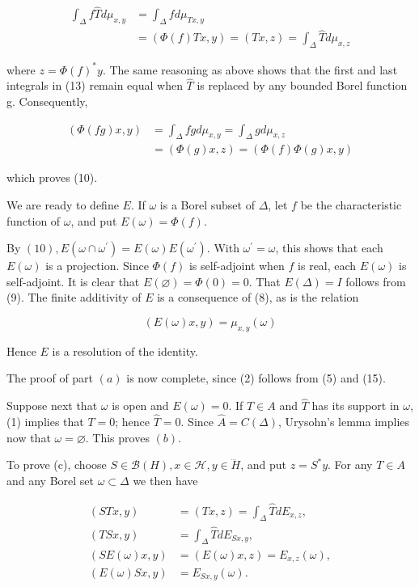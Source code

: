 \documentclass[10pt]{article}
\begin{document}
$$
\begin{aligned}
\int_{\Delta} f \hat{T} d \mu_{x, y} & =\int_{\Delta} f d \mu_{T x, y} \\
& =(\Phi(f) T x, y)=(T x, z)=\int_{\Delta} \hat{T} d \mu_{x, z}
\end{aligned}
$$

where $z=\Phi(f)^{*} y$. The same reasoning as above shows that the first and last integrals in (13) remain equal when $\hat{T}$ is replaced by any bounded Borel function g. Consequently,

$$
\begin{aligned}
(\Phi(f g) x, y) & =\int_{\Delta} f g d \mu_{x, y}=\int_{\Delta} g d \mu_{x, z} \\
& =(\Phi(g) x, z)=(\Phi(f) \Phi(g) x, y)
\end{aligned}
$$

which proves (10).

We are ready to define $E$. If $\omega$ is a Borel subset of $\Delta$, let $f$ be the characteristic function of $\omega$, and put $E(\omega)=\Phi(f)$.

By $(10), E\left(\omega \cap \omega^{\prime}\right)=E(\omega) E\left(\omega^{\prime}\right)$. With $\omega^{\prime}=\omega$, this shows that each $E(\omega)$ is a projection. Since $\Phi(f)$ is self-adjoint when $f$ is real, each $E(\omega)$ is self-adjoint. It is clear that $E(\varnothing)=\Phi(0)=0$. That $E(\Delta)=I$ follows from (9). The finite additivity of $E$ is a consequence of (8), as is the relation

$$
(E(\omega) x, y)=\mu_{x, y}(\omega)
$$

Hence $E$ is a resolution of the identity.

The proof of part $(a)$ is now complete, since (2) follows from (5) and (15).

Suppose next that $\omega$ is open and $E(\omega)=0$. If $T \in A$ and $\widehat{T}$ has its support in $\omega$, (1) implies that $T=0$; hence $\hat{T}=0$. Since $\hat{A}=C(\Delta)$, Urysohn's lemma implies now that $\omega=\varnothing$. This proves $(b)$.

To prove (c), choose $S \in \mathscr{B}(H), x \in \mathscr{H}, y \in \dddot{H}$, and put $z=S^{*} y$. For any $T \in A$ and any Borel set $\omega \subset \Delta$ we then have

$$
\begin{aligned}
(S T x, y) & =(T x, z)=\int_{\Delta} \hat{T} d E_{x, z}, \\
(T S x, y) & =\int_{\Delta} \hat{T} d E_{S x, y}, \\
(S E(\omega) x, y) & =(E(\omega) x, z)=E_{x, z}(\omega), \\
(E(\omega) S x, y) & =E_{S x, y}(\omega) .
\end{aligned}
$$
\end{document}
